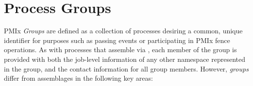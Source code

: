 \section{Process Groups}
\label{chap:api_sets_groups:groups}

\ac{PMIx} \emph{Groups} are defined as a collection of processes desiring a common, unique identifier for purposes such as passing events or participating in \ac{PMIx} fence operations. As with processes that assemble via , each member of the group is provided with both the job-level information of any other namespace represented in the group, and the contact information for all group members. However, \emph{groups} differ from  assemblages in the following key areas:

